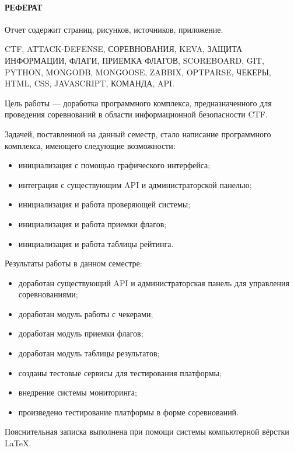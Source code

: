 \newpage
{}
\paragraph{\hfill РЕФЕРАТ \hfill}

Отчет содержит  страниц,  рисунков,  источников,  приложение.

CTF, ATTACK-DEFENSE, СОРЕВНОВАНИЯ, KEVA, ЗАЩИТА ИНФОРМАЦИИ, ФЛАГИ, ПРИЕМКА ФЛАГОВ, SCOREBOARD, GIT, PYTHON, MONGODB, MONGOOSE, ZABBIX, OPTPARSE, ЧЕКЕРЫ, HTML, CSS, JAVASCRIPT, КОМАНДА, API.

Цель работы --- доработка программного комплекса, предназначенного для проведения соревнований в области информационной безопасности CTF.

Задачей, поставленной на данный семестр, стало написание программного комплекса, имеющего следующие возможности: 
\begin{itemize}
\item инициализация с помощью графического интерфейса;
\item интеграция с существующим API и администраторской панелью; 
\item инициализация и работа проверяющей системы;
\item инициализация и работа приемки флагов;
\item инициализация и работа таблицы рейтинга.
\end{itemize}

Результаты работы в данном семестре:

\begin{itemize}
\item доработан существующий API и администраторская панель для управления соревнованиями; 
\item доработан модуль работы с чекерами;
\item доработан модуль приемки флагов;
\item доработан модуль таблицы результатов;
\item созданы тестовые сервисы для тестирования платформы;
\item внедрение системы мониторинга;
\item произведено тестирование платформы в форме соревнований.
\end{itemize}

Пояснительная записка выполнена при помощи системы компьютерной вёрстки \LaTeX.
